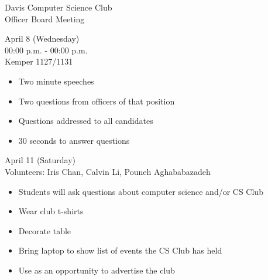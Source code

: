 \documentclass{article}
\begin{document}
\begin{Minutes}{Davis Computer Science Club\\Officer Board Meeting}

	






\maketitle

	
April 8 (Wednesday)\\
00:00 p.m. - 00:00 p.m.\\
Kemper 1127/1131	

\begin{itemize}
	\item Two minute speeches
	\item Two questions from officers of that position
	\item Questions addressed to all candidates
	\item 30 seconds to answer questions
\end{itemize}
	

April 11 (Saturday)\\
Volunteers: Iris Chan, Calvin Li, Pouneh Aghababazadeh

\begin{itemize}
	\item Students will ask questions about computer science and/or CS Club
	\item Wear club t-shirts
	\item Decorate table
	\item Bring laptop to show list of events the CS Club has held
	\item Use as an opportunity to advertise the club
\end{itemize}


\end{Minutes}
\end{document}
